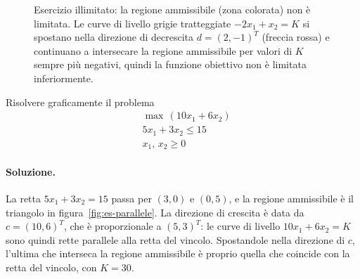 \begin{figure}[htbp]
\centering
{}
\caption{Esercizio illimitato: la regione ammissibile (zona colorata) non è limitata. Le curve di livello grigie tratteggiate $-2x_1+x_2=K$ si spostano nella direzione di decrescita $d=(2,-1)^T$ (freccia rossa) e continuano a intersecare la regione ammissibile per valori di $K$ sempre più negativi, quindi la funzione obiettivo non è limitata inferiormente.}
\label{fig:es-illimitato}
\end{figure}

\begin{esercizio}
Risolvere graficamente il problema
\[
\begin{aligned}
&\max\, (10x_1 + 6x_2) \\
&5x_1 + 3x_2 \le 15 \\
&x_1,\, x_2 \ge 0
\end{aligned}
\]
\end{esercizio}

\paragraph{Soluzione.}
La retta $5x_1 + 3x_2 = 15$ passa per $(3, 0)$ e $(0, 5)$, e la regione ammissibile è il triangolo in figura~\ref{fig:es-parallele}. La direzione di crescita è data da $c = (10, 6)^T$, che è proporzionale a $(5, 3)^T$: le curve di livello $10x_1 + 6x_2 = K$ sono quindi rette parallele alla retta del vincolo. Spostandole nella direzione di $c$, l'ultima che interseca la regione ammissibile è proprio quella che coincide con la retta del vincolo, con $K = 30$.

